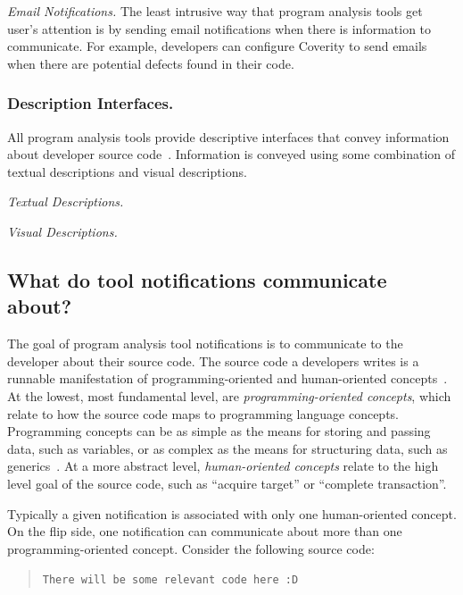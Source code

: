 \documentclass{llncs}
\begin{document}
\noindent\textit{Email Notifications.} The least intrusive way that program analysis tools get user's attention is by sending email notifications when there is information to communicate. For example, developers can configure Coverity to send emails when there are potential defects found in their code.

\subsubsection{Description Interfaces.}
All program analysis tools provide descriptive interfaces that convey information about developer source code~\cite{robillard2014recommendation}. 
Information is conveyed using some combination of textual descriptions and visual descriptions.

\noindent\textit{Textual Descriptions.}

\noindent\textit{Visual Descriptions.}

\subsection{What do tool notifications communicate about?}

The goal of program analysis tool notifications is to communicate to the developer about their source code.
The source code a developers writes is a runnable manifestation of programming-oriented and human-oriented concepts~\cite{van2004concepts,biggerstaff1994program}. 
At the lowest, most fundamental level, are \emph{programming-oriented concepts}, which relate to how the source code maps to programming language concepts.
Programming concepts can be as simple as the means for storing and passing data, such as variables, or as complex as the means for structuring data, such as generics~\cite{jazayeri1997programming}.
At a more abstract level, \emph{human-oriented concepts} relate to the high level goal of the source code, such as ``acquire target'' or ``complete transaction''.

Typically a given notification is associated with only one human-oriented concept.
On the flip side, one notification can communicate about more than one programming-oriented concept. 
Consider the following source code:

\begin{quotation}
	\texttt{There will be some relevant code here :D}
\end{quotation}
\end{document}
